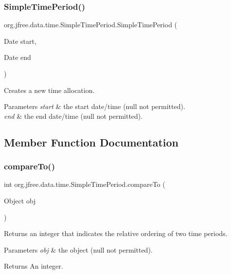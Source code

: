 \subsubsection{\texorpdfstring{Simple\+Time\+Period()}{SimpleTimePeriod()}\hspace{0.1cm}{\footnotesize\ttfamily [2/2]}}
{\footnotesize\ttfamily org.\+jfree.\+data.\+time.\+Simple\+Time\+Period.\+Simple\+Time\+Period (\begin{DoxyParamCaption}\item[{Date}]{start,  }\item[{Date}]{end }\end{DoxyParamCaption})}

Creates a new time allocation.


\begin{DoxyParams}{Parameters}
{\em start} & the start date/time ({\ttfamily null} not permitted). \\
\hline
{\em end} & the end date/time ({\ttfamily null} not permitted). \\
\hline
\end{DoxyParams}


\subsection{Member Function Documentation}
\mbox{\label{classorg_1_1jfree_1_1data_1_1time_1_1_simple_time_period_a35fc33fff28858317ef7cfd357e4f166}} 
\subsubsection{\texorpdfstring{compare\+To()}{compareTo()}}
{\footnotesize\ttfamily int org.\+jfree.\+data.\+time.\+Simple\+Time\+Period.\+compare\+To (\begin{DoxyParamCaption}\item[{Object}]{obj }\end{DoxyParamCaption})}

Returns an integer that indicates the relative ordering of two time periods.


\begin{DoxyParams}{Parameters}
{\em obj} & the object ({\ttfamily null} not permitted).\\
\hline
\end{DoxyParams}
\begin{DoxyReturn}{Returns}
An integer.
\end{DoxyReturn}

